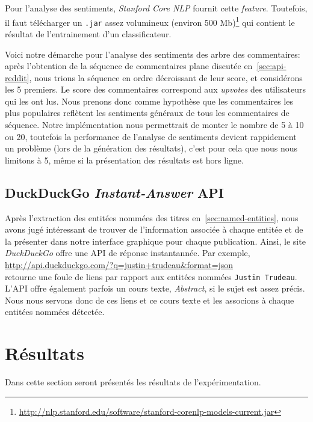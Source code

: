 \documentclass[12pt]{article}
\begin{document}
Pour l'analyse des sentiments, \textit{Stanford Core NLP} fournit cette \textit{feature}. Toutefois, il faut télécharger un \verb;.jar; assez volumineux (environ 500 Mb)\footnote{\url{http://nlp.stanford.edu/software/stanford-corenlp-models-current.jar}} qui contient le résultat de l'entrainement d'un classificateur.


Voici notre démarche pour l'analyse des sentiments des arbre des commentaires: après l'obtention de la séquence de commentaires plane discutée en~\ref{sec:api-reddit}, nous trions la séquence en ordre décroissant de leur score, et considérons les 5 premiers. Le score des commentaires correspond aux \textit{upvotes} des utilisateurs qui les ont lus. Nous prenons donc comme hypothèse que les commentaires les plus populaires reflètent les sentiments généraux de tous les commentaires de séquence. Notre implémentation nous permettrait de monter le nombre de 5 à 10 ou 20, toutefois la performance de l'analyse de sentiments devient rappidement un problème (lors de la génération des résultats), c'est pour cela que nous nous limitons à 5, même si la présentation des résultats est hors ligne.

\subsection{DuckDuckGo \textit{Instant-Answer} API}

Après l'extraction des entitées nommées des titres en~\ref{sec:named-entities}, nous avons jugé intéressant de trouver de l'information associée à chaque entitée et de la présenter dans notre interface graphique pour chaque publication. Ainsi, le site \textit{DuckDuckGo} offre une API de réponse instantannée. Par exemple,\\

\url{http://api.duckduckgo.com/?q=justin+trudeau&format=json}\\

retourne une foule de liens par rapport aux entitées nommées \verb;Justin Trudeau;. L'API offre également parfois un cours texte, \textit{Abstract}, si le sujet est assez précis. Nous nous servons donc de ces liens et ce cours texte et les associons à chaque entitées nommées détectée.

\section{Résultats}

Dans cette section seront présentés les résultats de l'expérimentation.
\end{document}
